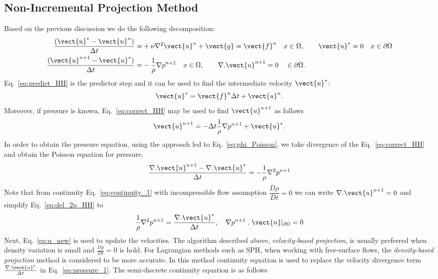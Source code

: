 \subsection{Non-Incremental Projection Method}
Based on the previous discussion we do the following decomposition: 
\begin{align}
\dfrac{(\vect{u}^*-\vect{u}^n)}{\Delta t}=&+\nu \nabla^2\vect{u}^n + \vect{g}=\vect{f}^n \quad x\in \Omega, \qquad \vect{u}^*=0 \quad x\in \partial\Omega\label{eq:predict_HH} \\
\dfrac{(\vect{u}^{n+1}-\vect{u}^*)}{\Delta t}=&-\dfrac{1}{\rho} \nabla p^{n+1}\quad x\in \Omega, \qquad \nabla.\vect{u}^{n+1}=0 \quad \in \partial\Omega \label{eq:correct_HH}.
\end{align}
Eq.~\ref{eq:predict_HH} is the predictor step and it can be used to find the intermediate velocity $\vect{u}^*$:
\begin{equation}\label{eq:u_star}
\vect{u}^*=\vect{f}^n {\Delta t}+\vect{u}^n.
\end{equation}
Moreover, if pressure is known, Eq.~\ref{eq:correct_HH} may be used to find $\vect{u}^{n+1}$ as follows
\begin{equation}\label{eq:u_new}
\vect{u}^{n+1}=-{\Delta t}\dfrac{1}{\rho} \nabla p^{n+1}+\vect{u}^*.
\end{equation}
In order to obtain the pressure equation, using the approach led to Eq.~\ref{eq:phi_Poisson}, we take divergence of the Eq.~\ref{eq:correct_HH} and obtain the Poisson equation for pressure. 
\begin{equation}\label{eq:del_2p_HH}
\dfrac{\nabla.\vect{u}^{n+1}-\nabla.\vect{u}^*}{\Delta t}=-\dfrac{1}{\rho} \nabla^2 p^{n+1}
\end{equation}
Note that from continuity Eq.~\ref{eq:continuity_1} with incompressible flow assumption $\dfrac{D\rho}{Dt}=0$ we can write  $\nabla . \vect{u}^{n+1} =0$ and simplify Eq.~\ref{eq:del_2p_HH} to 
\begin{equation}\label{eq:pressure_1}
\dfrac{1}{\rho} \nabla^2 p^{n+1}=\dfrac{\nabla.\vect{u}^*}{\Delta t}, \quad \nabla p^{n+1}\;.\;\vect{n}|_{\partial \Omega}=0
\end{equation}
Next, Eq.~\ref{eq:u_new} is used to update the velocities. The algorithm described above, \textit{velocity-based projection}, is usually preferred when density variation is small and $\frac{D\rho}{Dt}=0$ is hold. For Lagrangian methods such as SPH, when working with free-surface flows, the \textit{density-based projection} method is considered to be more accurate. In this method continuity equation is used to replace the velocity divergence term $\frac{\nabla.\vect{u}^*}{\Delta t}$ in Eq.~\ref{eq:pressure_1}. The semi-discrete continuity equation is as follows
